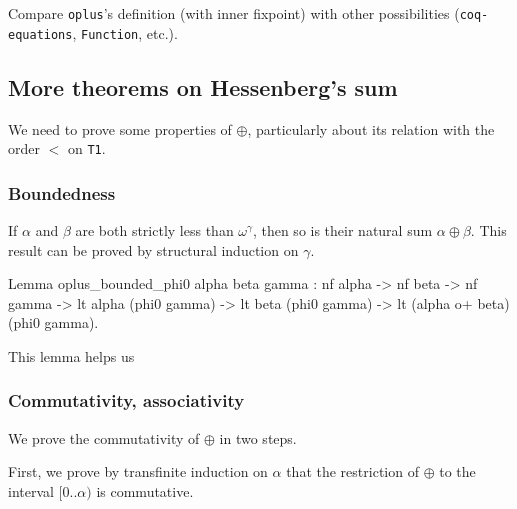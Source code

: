 


    \begin{project}
    Compare \texttt{oplus}'s definition (with inner fixpoint) with other possibilities
    (\texttt{coq-equations}, \texttt{Function}, etc.).
    \end{project}
    \subsection{More theorems on Hessenberg's sum}

    We need to prove some properties of $\oplus$, particularly about 
    its relation with the order $<$ on \texttt{T1}.

    \subsubsection{Boundedness}
    If $\alpha$ and $\beta$ are both strictly  less than  $\omega^\gamma$, then so is their natural sum
    $\alpha \oplus \beta$. This result can be proved by structural induction on $\gamma$.


    \begin{Coqsrc}
    Lemma oplus_bounded_phi0 alpha beta gamma :
      nf alpha -> nf beta -> nf gamma ->
      lt alpha (phi0 gamma) ->
      lt beta (phi0 gamma) ->
      lt (alpha o+ beta) (phi0 gamma).
    \end{Coqsrc}

    This lemma helps us 

    \subsubsection{Commutativity, associativity}

    We prove  the commutativity of $\oplus$ in two steps. 

    First, we prove by transfinite induction on $\alpha$ that the restriction of $\oplus$ to the
    interval $[0..\alpha)$ is commutative.

